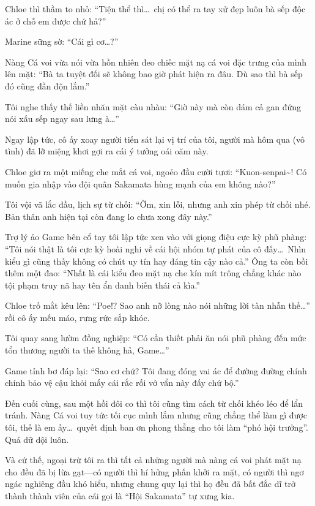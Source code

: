 \documentclass[../main.tex]{subfiles}
\begin{document}
Chloe thì thầm to nhỏ: ``Tiện thể thì\dots\ chị có thể ra tay xử đẹp luôn bà sếp độc ác ở chỗ em được chứ hả?''

Marine sững sờ: ``Cái gì cơ\dots?''

Nàng Cá voi vừa nói vừa hồn nhiên đeo chiếc mặt nạ cá voi đặc trưng của mình lên mặt: ``Bà ta tuyệt đối sẽ không bao giờ phát hiện ra đâu. Dù sao thì bà sếp đó cũng đần độn lắm.''

Tôi nghe thấy thế liền nhăn mặt càu nhàu: ``Giờ này mà còn dám cả gan đứng nói xấu sếp ngay sau lưng à\dots''

Ngay lập tức, cô ấy xoay người tiến sát lại vị trí của tôi, người mà hôm qua (vô tình) đã lỡ miệng khơi gợi ra cái ý tưởng oái oăm này.

Chloe giơ ra một miếng che mắt cá voi, ngoẻo đầu cười tươi: ``Kuon-senpai\~{}! Có muốn gia nhập vào đội quân Sakamata hùng mạnh của em không nào?''

Tôi vội vã lắc đầu, lịch sự từ chối: ``Ờm, xin lỗi, nhưng anh xin phép từ chối nhé. Bản thân anh hiện tại còn đang lo chưa xong đây này.''

Trợ lý ảo Game bên cổ tay tôi lập tức xen vào với giọng điệu cực kỳ phũ phàng: ``Tôi nói thật là tôi cực kỳ hoài nghi về cái hội nhóm tự phát của cô đấy\dots\ Nhìn kiểu gì cũng thấy không có chút uy tín hay đáng tin cậy nào cả.'' Ông ta còn bồi thêm một đao: ``Nhất là cái kiểu đeo mặt nạ che kín mít trông chẳng khác nào tội phạm truy nã hay tên ẩn danh biến thái cả kìa.''

Chloe trố mắt kêu lên: ``Poe!? Sao anh nỡ lòng nào nói những lời tàn nhẫn thế\dots'' rồi cô ấy mếu máo, rưng rức sắp khóc.

Tôi quay sang lườm đồng nghiệp: ``Có cần thiết phải ăn nói phũ phàng đến mức tổn thương người ta thế không hả, Game\dots''

Game tỉnh bơ đáp lại: ``Sao cơ chứ? Tôi đang đóng vai ác để đường đường chính chính bảo vệ cậu khỏi mấy cái rắc rối vớ vẩn này đấy chứ bộ.''

Đến cuối cùng, sau một hồi đôi co thì tôi cũng tìm cách từ chối khéo léo để lẩn tránh. Nàng Cá voi tuy tức tối cục mình lắm nhưng cũng chẳng thể làm gì được tôi, thế là em ấy\dots\ quyết định ban ơn phong thẳng cho tôi làm ``phó hội trưởng''. Quá dữ dội luôn.

Và cứ thế, ngoại trừ tôi ra thì tất cả những người mà nàng cá voi phát mặt nạ cho đều đã bị lừa gạt—có người thì hí hửng phấn khởi ra mặt, có người thì ngơ ngác nghiêng đầu khó hiểu, nhưng chung quy lại thì họ đều đã bất đắc dĩ trở thành thành viên của cái gọi là ``Hội Sakamata'' tự xưng kia.
\end{document}
